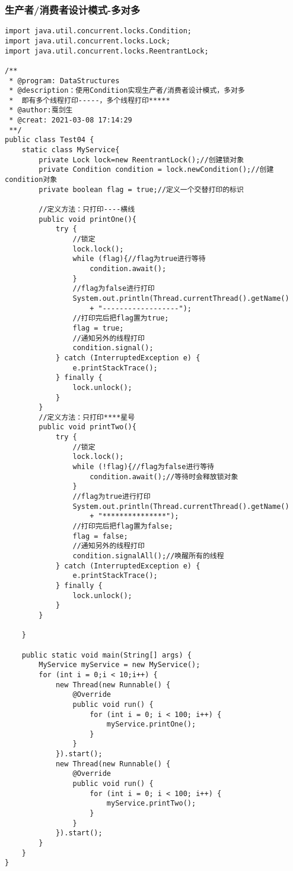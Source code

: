 \documentclass[a4paper]{report}
\begin{document}
\subsubsection{生产者/消费者设计模式-多对多}
\begin{Verbatim}[frame=single,numbersep=5pt,xleftmargin=1.5em,xrightmargin=1.5em]
import java.util.concurrent.locks.Condition;
import java.util.concurrent.locks.Lock;
import java.util.concurrent.locks.ReentrantLock;

/**
 * @program: DataStructures
 * @description：使用Condition实现生产者/消费者设计模式，多对多
 *  即有多个线程打印-----，多个线程打印*****
 * @author:戛剑生
 * @creat: 2021-03-08 17:14:29
 **/
public class Test04 {
    static class MyService{
        private Lock lock=new ReentrantLock();//创建锁对象
        private Condition condition = lock.newCondition();//创建condition对象
        private boolean flag = true;//定义一个交替打印的标识

        //定义方法：只打印----横线
        public void printOne(){
            try {
                //锁定
                lock.lock();
                while (flag){//flag为true进行等待
                    condition.await();
                }
                //flag为false进行打印
                System.out.println(Thread.currentThread().getName()
                    + "------------------");
                //打印完后把flag置为true;
                flag = true;
                //通知另外的线程打印
                condition.signal();
            } catch (InterruptedException e) {
                e.printStackTrace();
            } finally {
                lock.unlock();
            }
        }
        //定义方法：只打印****星号
        public void printTwo(){
            try {
                //锁定
                lock.lock();
                while (!flag){//flag为false进行等待
                    condition.await();//等待时会释放锁对象
                }
                //flag为true进行打印
                System.out.println(Thread.currentThread().getName()
                    + "***************");
                //打印完后把flag置为false;
                flag = false;
                //通知另外的线程打印
                condition.signalAll();//唤醒所有的线程
            } catch (InterruptedException e) {
                e.printStackTrace();
            } finally {
                lock.unlock();
            }
        }

    }

    public static void main(String[] args) {
        MyService myService = new MyService();
        for (int i = 0;i < 10;i++) {
            new Thread(new Runnable() {
                @Override
                public void run() {
                    for (int i = 0; i < 100; i++) {
                        myService.printOne();
                    }
                }
            }).start();
            new Thread(new Runnable() {
                @Override
                public void run() {
                    for (int i = 0; i < 100; i++) {
                        myService.printTwo();
                    }
                }
            }).start();
        }
    }
}\end{Verbatim}
\end{document}
